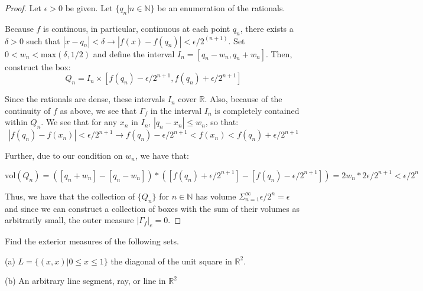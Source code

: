 \documentclass[10pt]{article}
\newenvironment{problem}[2][Problem]{\begin{trivlist}
\item[\hskip \labelsep {\bfseries #1}\hskip \labelsep {\bfseries #2.}]}{\end{trivlist}}
\begin{document}
\begin{proof}[Proof]
Let $\epsilon > 0$ be given. Let $\{ q_n | n \in \mathbb{N} \}$ be an enumeration of the rationals.

Because $f$ is continous, in particular, continuous at each point $q_n$, there exists a $\delta > 0$ such that $ |x - q_n| < \delta \rightarrow |f(x) - f(q_n)| < \epsilon / 2^{(n+1)}$. Set $0 < w_n < \text{max}(\delta,1/2)$ and define the interval $I_n = [q_n - w_n, q_n + w_n]$. Then, construct the box:
$$Q_n = I_n \times [f(q_n) - \epsilon / 2^{n+1}, f(q_n) + \epsilon / 2^{n+1}]$$

Since the rationals are dense, these intervals $I_n$ cover $\mathbb{R}$. Also, because of the continuity of $f$ as above, we see that $\Gamma_f$ in the interval $I_n$ is completely contained within $Q_n$. We see that for any $x_n$ in $I_n$, $|q_n - x_n| \leq w_n$, so that:
$$|f(q_n) - f(x_n)| <  \epsilon / 2^{n+1} \rightarrow f(q_n) - \epsilon / 2^{n+1} <  f(x_n) < f(q_n) + \epsilon / 2^{n+1}$$

Further, due to our condition on $w_n$, we have that:

$$\text{vol}(Q_n) = ( [q_n + w_n] - [q_n - w_n]) * ([ f(q_n) + \epsilon / 2^{n+1}] - [ f(q_n) - \epsilon / 2^{n+1}]) = 2w_n * 2\epsilon/2^{n+1} < \epsilon/2^n $$

Thus, we have that the collection of $\{ Q_n \}$ for $n \in \mathbb{N}$ has volume $\Sigma_{n=1}^{\infty} \epsilon/2^n = \epsilon$ and since we can construct a collection of boxes with the sum of their volumes as arbitrarily small, the outer measure $|\Gamma_f|_e = 0$.

\end{proof}

\begin{problem}{2.1.35}
Find the exterior measures of the following sets.

(a) $L = \{(x,x) | 0 \leq x \leq 1 \}$ the diagonal of the unit square in $\mathbb{R}^2$.

(b) An arbitrary line segment, ray, or line in $\mathbb{R}^2$
\end{problem}
\end{document}
